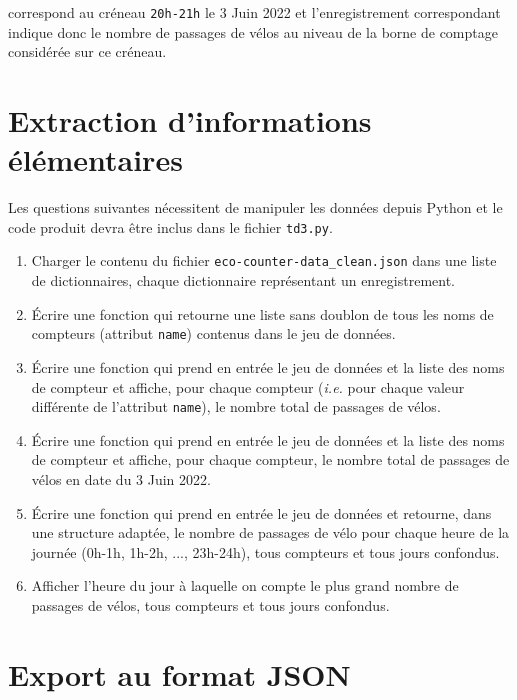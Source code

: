 \documentclass[11pt,a4paper]{article}
\begin{document}
\noindent
correspond au créneau \verb+20h-21h+ le 3 Juin 2022 et l'enregistrement correspondant indique donc le nombre de passages de vélos au niveau de la borne de comptage considérée sur ce créneau.

\section{Extraction d'informations élémentaires}

Les questions suivantes nécessitent de manipuler les données depuis Python et le code produit devra être inclus dans le fichier \verb+td3.py+.

\begin{enumerate}
\item Charger le contenu du fichier \verb+eco-counter-data_clean.json+ dans une liste de dictionnaires, chaque dictionnaire représentant un enregistrement.

\item Écrire une fonction qui retourne une liste sans doublon de tous les noms de compteurs (attribut \verb+name+) contenus dans le jeu de données.

\item Écrire une fonction qui prend en entrée le jeu de données et la liste des noms de compteur et affiche, pour chaque compteur (\emph{i.e.} pour chaque valeur différente de l'attribut \verb+name+), le nombre total de passages de vélos.

\item Écrire une fonction qui prend en entrée le jeu de données et la liste des noms de compteur et affiche, pour chaque compteur, le nombre total de passages de vélos en date du 3 Juin 2022.

\item Écrire une fonction qui prend en entrée le jeu de données et retourne, dans une structure adaptée, le nombre de passages de vélo pour chaque heure de la journée (0h-1h, 1h-2h, ..., 23h-24h), tous compteurs et tous jours confondus.

\item Afficher l'heure du jour à laquelle on compte le plus grand nombre de passages de vélos, tous compteurs et tous jours confondus.
\end{enumerate}

\section{Export au format JSON}
\end{document}
